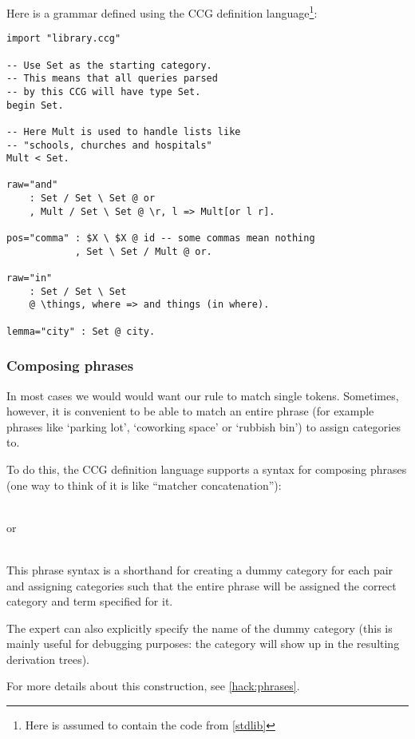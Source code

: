 \documentclass[main.tex]{subfiles}
\begin{document}
\begin{exampleenv}
Here is a grammar defined using the CCG definition language\footnote{
    Here  is assumed to contain the code from \cref{stdlib}
}:
\begin{lstlisting}
import "library.ccg"

-- Use Set as the starting category.
-- This means that all queries parsed
-- by this CCG will have type Set.
begin Set.

-- Here Mult is used to handle lists like
-- "schools, churches and hospitals"
Mult < Set.

raw="and"
    : Set / Set \ Set @ or
    , Mult / Set \ Set @ \r, l => Mult[or l r].

pos="comma" : $X \ $X @ id -- some commas mean nothing
            , Set \ Set / Mult @ or.

raw="in"
    : Set / Set \ Set
    @ \things, where => and things (in where).

lemma="city" : Set @ city.
\end{lstlisting}
\end{exampleenv}

\subsubsection{Composing phrases}
In most cases we would would want our rule to match single tokens. Sometimes,
however, it is convenient to be able to match an entire phrase (for example
phrases like `parking lot', `coworking space' or `rubbish bin') to assign
categories to.

To do this, the CCG definition language supports a syntax for composing phrases
(one way to think of it is like ``matcher concatenation''):
\begin{center}
     \code{<>}  \\
    or \\
       \\
\end{center}
This phrase syntax is a shorthand for creating a dummy category
for each pair and assigning categories such that the entire phrase will
be assigned the correct category and term specified for it.

The expert can also explicitly specify the name of the dummy category
(this is mainly useful for debugging purposes: the category will show up
in the resulting derivation trees).

For more details about this construction, see \cref{hack:phrases}.
\end{document}
